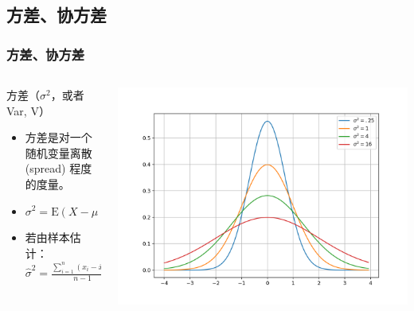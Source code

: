 \documentclass[serif,aspectratio=169]{beamer}
\begin{document}
\subsection{方差、协方差}
\begin{frame}
  \frametitle{方差、协方差}
  \begin{columns}
    \begin{column}{.5\textwidth}
      \begin{block}{方差（$\sigma^2$，或者 Var, V）}
        \begin{itemize}
        \item 方差是对一个随机变量离散 (spread) 程度的度量。
        \item $\sigma^2=\mathrm{E}(X-\mu)^2$
        \item 若由样本估计：$\displaystyle\hat{\sigma}^2=\frac{\sum_{i=1}^n(x_i-\bar{x})^2}{n-1}$
        \end{itemize}
      \end{block}
    \end{column}
    \begin{column}{.5\textwidth}
      \includegraphics[width=\textwidth]{img/normal-4.png}
    \end{column}
  \end{columns}
\end{frame}
\end{document}
